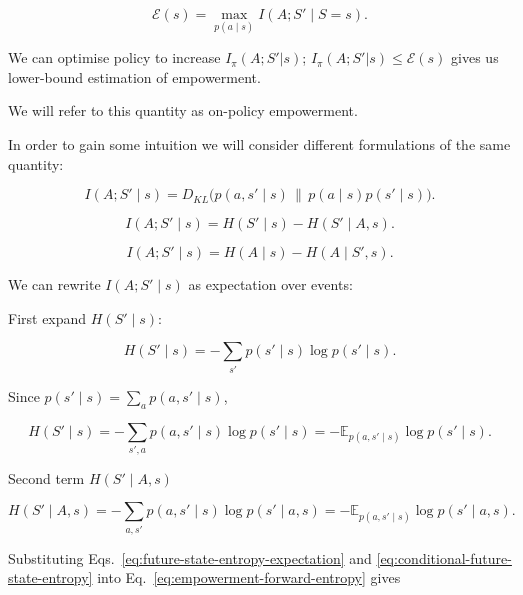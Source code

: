 \begin{equation}
\mathcal{E}(s) = \max_{p(a\mid s)} I(A;S'\mid S=s).
\label{eq:empowerment-definition}
\end{equation}

We can optimise policy to increase $I_{\pi}(A;S'|s)$; $I_{\pi}(A;S'|s) \leq \mathcal{E}(s)$ gives us lower-bound estimation of empowerment.

We will refer to this quantity as on-policy empowerment.

In order to gain some intuition we will consider different formulations of the same quantity:

\begin{equation}
I(A;S'\mid s)
= D_{KL}\bigl(p(a,s'\mid s)\,\|\,p(a\mid s)p(s'\mid s)\bigr).
\label{eq:empowerment-kl-form}
\end{equation}

\begin{equation}
I(A;S'\mid s) = H(S'\mid s)-H(S'\mid A,s).
\label{eq:empowerment-forward-entropy}
\end{equation}

\begin{equation}
I(A;S'\mid s) = H(A\mid s)-H(A\mid S',s).
\label{eq:empowerment-inverse-entropy}
\end{equation}

We can rewrite $I(A; S' \mid s)$  as expectation over events:

First expand $H(S' \mid s)$:

\begin{equation}
H(S'\mid s) = -\sum_{s'}p(s'\mid s)\log p(s'\mid s).
\label{eq:future-state-entropy-expansion}
\end{equation}

Since $p(s'\mid s)=\sum_a p(a,s'\mid s)$,

\begin{equation}
H(S'\mid s)
= -\sum_{s',a}p(a,s'\mid s)\log p(s'\mid s)
= -\mathbb{E}_{p(a,s'\mid s)}\log p(s'\mid s).
\label{eq:future-state-entropy-expectation}
\end{equation}

Second term $H(S' \mid A,s)$

\begin{equation}
H(S'\mid A,s)
= -\sum_{a,s'}p(a,s'\mid s)\log p(s'\mid a,s)
= -\mathbb{E}_{p(a,s'\mid s)}\log p(s'\mid a,s).
\label{eq:conditional-future-state-entropy}
\end{equation}

Substituting Eqs.~\eqref{eq:future-state-entropy-expectation} and
\eqref{eq:conditional-future-state-entropy} into
Eq.~\eqref{eq:empowerment-forward-entropy} gives

